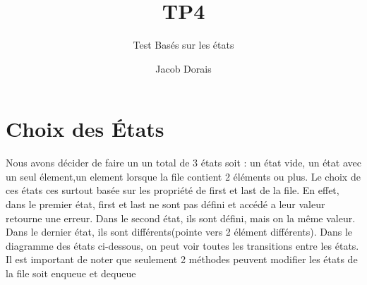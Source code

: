 \documentclass[11pt]{article}
\title{TP4}
\subtitle{Test Basés sur les états}
\author{Jacob Dorais}{Billy Bouchard}{Gr 02}
\begin{document}
\maketitle
\section{Choix des États}
Nous avons décider de faire un un total de 3 états soit : un état vide, un état avec un seul élement,un element lorsque la file contient 2 éléments ou plus.
Le choix de ces états ces surtout basée sur les propriété de first et last de la file.
En effet, dans le premier état, first et last ne sont pas défini et accédé a leur valeur retourne une erreur.
Dans le second état, ils sont défini, mais on la même valeur.
Dans le dernier état, ils sont différents(pointe vers 2 élément différents).
Dans le diagramme des états ci-dessous, on peut voir toutes les transitions entre les états.
Il est important de noter que seulement 2 méthodes peuvent modifier les états de la file soit enqueue et dequeue
\end{document}
